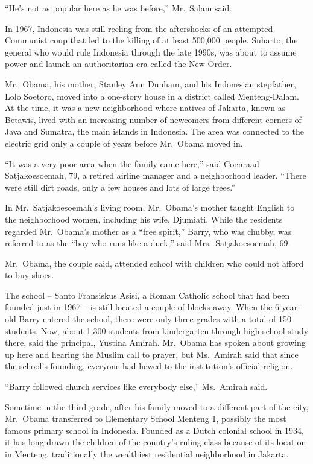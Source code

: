 ﻿\documentclass[12pt]{article}
\begin{document}
``He's not as popular here as he was before,'' Mr.~Salam said.

In 1967, Indonesia was still reeling from the aftershocks of an attempted Communist coup that led to
the killing of at least 500,000 people. Suharto, the general who would rule Indonesia through the
late 1990s, was about to assume power and launch an authoritarian era called the New Order.

Mr.~Obama, his mother, Stanley Ann Dunham, and his Indonesian stepfather, Lolo Soetoro, moved into a
one-story house in a district called Menteng-Dalam. At the time, it was a new neighborhood where
natives of Jakarta, known as Betawis, lived with an increasing number of newcomers from different
corners of Java and Sumatra, the main islands in Indonesia. The area was connected to the electric
grid only a couple of years before Mr.~Obama moved in.

``It was a very poor area when the family came here,'' said Coenraad Satjakoesoemah, 79, a retired
airline manager and a neighborhood leader. ``There were still dirt roads, only a few houses and lots
of large trees.''

In Mr.~Satjakoesoemah's living room, Mr.~Obama's mother taught English to the neighborhood women,
including his wife, Djumiati. While the residents regarded Mr.~Obama's mother as a ``free spirit,''
Barry, who was chubby, was referred to as the ``boy who runs like a duck,'' said
Mrs.~Satjakoesoemah, 69.

Mr.~Obama, the couple said, attended school with children who could not afford to buy shoes.

The school -- Santo Fransiskus Asisi, a Roman Catholic school that had been founded just in 1967 --
is still located a couple of blocks away. When the 6-year-old Barry entered the school, there were
only three grades with a total of 150 students. Now, about 1,300 students from kindergarten through
high school study there, said the principal, Yustina Amirah. Mr.~Obama has spoken about growing up
here and hearing the Muslim call to prayer, but Ms.~Amirah said that since the school's founding,
everyone had hewed to the institution's official religion.

``Barry followed church services like everybody else,'' Ms.~Amirah said.

Sometime in the third grade, after his family moved to a different part of the city, Mr.~Obama
transferred to Elementary School Menteng 1, possibly the most famous primary school in Indonesia.
Founded as a Dutch colonial school in 1934, it has long drawn the children of the country's ruling
class because of its location in Menteng, traditionally the wealthiest residential neighborhood in
Jakarta.
\end{document}
